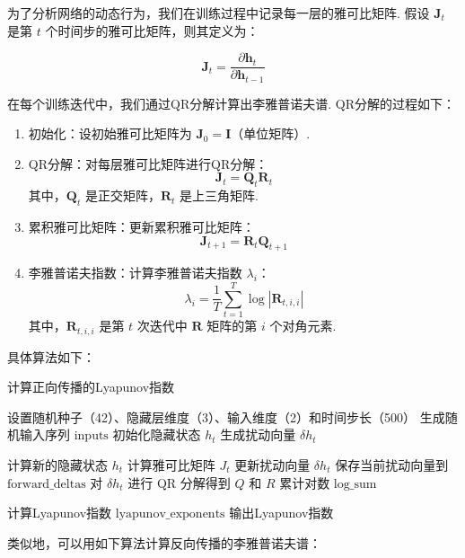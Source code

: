 为了分析网络的动态行为，我们在训练过程中记录每一层的雅可比矩阵. 假设 \(\mathbf{J}_t\) 是第 \(t\) 个时间步的雅可比矩阵，则其定义为：

\[
\mathbf{J}_t = \frac{\partial \mathbf{h}_t}{\partial \mathbf{h}_{t-1}}
\]

在每个训练迭代中，我们通过QR分解计算出李雅普诺夫谱. QR分解的过程如下：

\begin{enumerate}


\item 初始化：设初始雅可比矩阵为 \(\mathbf{J}_0 = \mathbf{I}\)（单位矩阵）. 
\item QR分解：对每层雅可比矩阵进行QR分解：
   \[
   \mathbf{J}_t = \mathbf{Q}_t \mathbf{R}_t
   \]
   其中，\(\mathbf{Q}_t\) 是正交矩阵，\(\mathbf{R}_t\) 是上三角矩阵. 
\item 累积雅可比矩阵：更新累积雅可比矩阵：
   \[
   \mathbf{J}_{t+1} = \mathbf{R}_t \mathbf{Q}_{t+1}
   \]
\item 李雅普诺夫指数：计算李雅普诺夫指数 \(\lambda_i\)：
   \[
   \lambda_i = \frac{1}{T} \sum_{t=1}^T \log |\mathbf{R}_{t,i,i}|
   \]
   其中，\(\mathbf{R}_{t,i,i}\) 是第 \(t\) 次迭代中 \(\mathbf{R}\) 矩阵的第 \(i\) 个对角元素. 

\end{enumerate}

具体算法如下：

\begin{algorithm}
   \caption{计算正向传播的Lyapunov指数}
   \begin{algorithmic}[1]
      \STATE 设置随机种子（42）、隐藏层维度（3）、输入维度（2）和时间步长（500）
      \STATE 生成随机输入序列 $\text{inputs}$
      \STATE 初始化隐藏状态 $h_t$
      \STATE 生成扰动向量 $\delta h_t$

            \STATE 计算新的隐藏状态 $h_t$
            \STATE 计算雅可比矩阵 $J_t$
            \STATE 更新扰动向量 $\delta h_t$
            \STATE 保存当前扰动向量到 $\text{forward\_deltas}$
            \STATE 对 $\delta h_t$ 进行 QR 分解得到 $Q$ 和 $R$
            \STATE 累计对数 $\text{log\_sum}$
      \ENDFOR

      \STATE 计算Lyapunov指数 $\text{lyapunov\_exponents}$
      \STATE 输出Lyapunov指数
   \end{algorithmic}
\end{algorithm}

类似地，可以用如下算法计算反向传播的李雅普诺夫谱：

